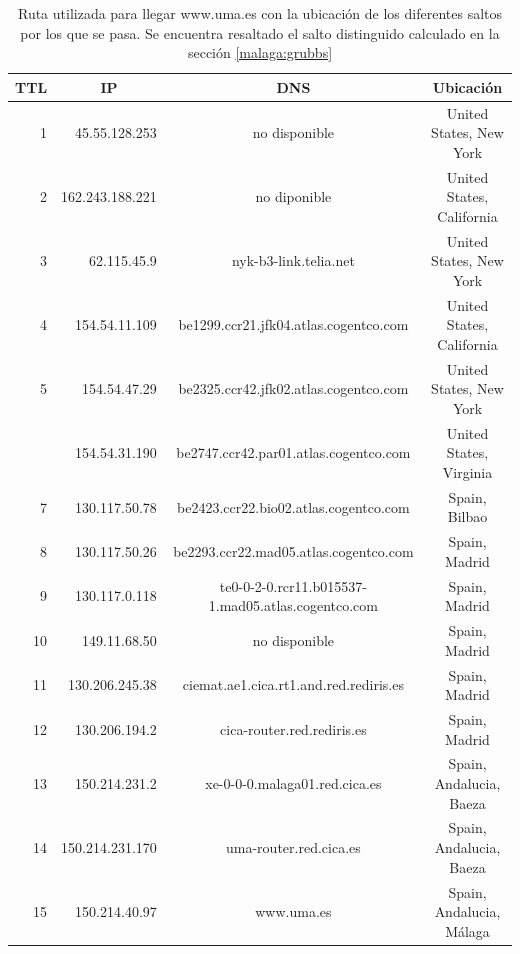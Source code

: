 \begin{table}[H]
    \begin{center}
        \begin{tabular}{| r | r | c | c |}
  \hline
  {\bf TTL} & \multicolumn{1}{|c|}{\bf IP} & {\bf DNS} & {\bf Ubicación}\\
  \hline
\hline 1 & 45.55.128.253 & no disponible & United States, New York\\
\hline 2 & 162.243.188.221 & no diponible & United States, California\\
\hline 3 & 62.115.45.9 & nyk-b3-link.telia.net & United States, New York\\
\hline 4 & 154.54.11.109 & be1299.ccr21.jfk04.atlas.cogentco.com & United States, California\\
\hline 5 & 154.54.47.29 & be2325.ccr42.jfk02.atlas.cogentco.com & United States, New York\\
\rowcolor{blue!25}\hline 6 & 154.54.31.190 & be2747.ccr42.par01.atlas.cogentco.com & United States, Virginia\\
\hline 7 & 130.117.50.78 & be2423.ccr22.bio02.atlas.cogentco.com & Spain, Bilbao\\
\hline 8 & 130.117.50.26 & be2293.ccr22.mad05.atlas.cogentco.com & Spain, Madrid\\
\hline 9 & 130.117.0.118 & te0-0-2-0.rcr11.b015537-1.mad05.atlas.cogentco.com & Spain, Madrid\\
\hline 10 & 149.11.68.50 & no disponible & Spain, Madrid\\
\hline 11 & 130.206.245.38 & ciemat.ae1.cica.rt1.and.red.rediris.es & Spain, Madrid\\
\hline 12 & 130.206.194.2 & cica-router.red.rediris.es & Spain, Madrid\\
\hline 13 & 150.214.231.2 & xe-0-0-0.malaga01.red.cica.es & Spain, Andalucia, Baeza\\
\hline 14 & 150.214.231.170 & uma-router.red.cica.es & Spain, Andalucia, Baeza\\
\hline 15 & 150.214.40.97 & www.uma.es & Spain, Andalucia, M\'alaga\\
\hline
        \end{tabular}
        \caption{Ruta utilizada para llegar www.uma.es con la ubicación de los diferentes saltos por los que se pasa. Se encuentra resaltado el salto distinguido calculado en la sección \ref{malaga:grubbs}}
        \label{table:malaga} 
    \end{center}
\end{table}

